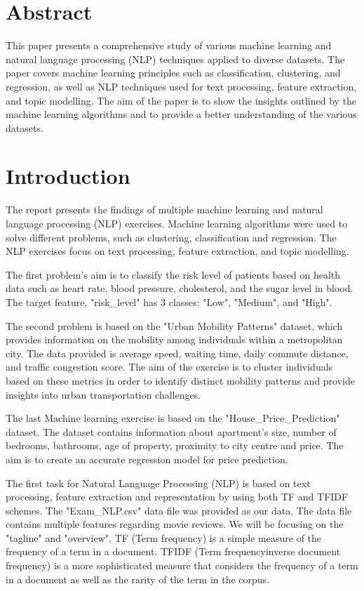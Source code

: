 \documentclass{article}
\begin{document}
\begin{multicols}{2}

\section{Abstract}

This paper presents a comprehensive study of various machine learning and natural language processing (NLP) techniques applied to diverse datasets. The paper covers machine learning principles such as classification, clustering, and regression, as well as NLP techniques used for text processing, feature extraction, and topic modelling. The aim of the paper is to show the insights outlined by the machine learning algorithms and to provide a better understanding of the various datasets.


\section{Introduction}

The report presents the findings of multiple machine learning and natural language processing (NLP) exercises. Machine learning algorithms were used to solve different problems, such as clustering, classification and regression. The NLP exercises focus on text processing, feature extraction, and topic modelling.

The first problem's aim is to classify the risk level of patients based on health data such as heart rate, blood pressure, cholesterol, and the sugar level in blood. The target feature, "risk\_level" has 3 classes: "Low", "Medium", and "High".

The second problem is based on the "Urban Mobility Patterns" dataset, which provides information on the mobility among individuals within a metropolitan city. The data provided is average speed, waiting time, daily commute distance, and traffic congestion score. The aim of the exercise is to cluster individuals based on these metrics in order to identify distinct mobility patterns and provide insights into urban transportation challenges.

The last Machine learning exercise is based on the "House\_Price\_Prediction" dataset. The dataset contains information about apartment's size, number of bedrooms, bathrooms, age of property, proximity to city centre and price. The aim is to create an accurate regression model for price prediction.

The first task for Natural Language Processing (NLP) is based on text processing, feature extraction and representation by using both TF and TF\-IDF schemes. The "Exam\_NLP.csv" data file was provided as our data. The data file contains multiple features regarding movie reviews. We will be focusing on the "tagline" and "overview". TF (Term frequency) is a simple measure of the frequency of a term in a document. TF\-IDF (Term frequency\-inverse document frequency) is a more sophisticated measure that considers the frequency of a term in a document as well as the rarity of the term in the corpus.


\end{multicols}
\end{document}
